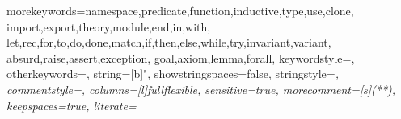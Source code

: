 

\newcommand{\why}{\textsf{Why3}\xspace}
\newcommand{\whyml}{\textsf{WhyML}\xspace}
\newcommand{\eg}{\emph{e.g.}\xspace}
\newcommand{\ie}{\emph{i.e.}\xspace}

\newcommand{\keyword}[1]{\texttt{#1}}
\newcommand{\indextt}[1]{\index{#1@\protect\keyword{#1}}}
\newcommand{\indexttbs}[1]{\index{#1@\protect\keywordbs{#1}}}
\newif\ifspace
\newif\ifnewentry
\newcommand{\addspace}{\ifspace ~ \spacefalse \fi}
\newcommand{\term}[2]{\addspace\hbox{\lstinline|#1|%
\ifthenelse{\equal{#2}{}}{}{\indexttbase{#2}{#1}}}\spacetrue}
\newcommand{\nonterm}[2]{%
  \ifthenelse{\equal{#2}{}}%
             {\addspace\hbox{\textsl{#1}\ifnewentry\index{#1@\textsl{#1}}\fi}\spacetrue}%
             {\addspace\hbox{\textsl{#1}\footnote{#2}\ifnewentry\index{grammar entries!\textsl{#1}}\fi}\spacetrue}}
\newcommand{\repetstar}{$^*$\spacetrue}
\newcommand{\repetplus}{$^+$\spacetrue}
\newcommand{\repetone}{$^?$\spacetrue}
\newcommand{\lparen}{\addspace(}
\newcommand{\rparen}{)}
\newcommand{\orelse}{\addspace$\mid$\spacetrue}
\newcommand{\sep}{ \\[2mm] \spacefalse\newentrytrue}
\newcommand{\newl}{ \\ & & \spacefalse}
\newcommand{\alt}{ \\ & $\mid$ & \spacefalse}
\newcommand{\is}{ & $::=$ & \newentryfalse}
\newenvironment{syntax}{\begin{tabular}{@{}rrll@{}}\spacefalse\newentrytrue}{\end{tabular}}
\newcommand{\synt}[1]{$\spacefalse#1$}
\newcommand{\emptystring}{$\epsilon$}
\newcommand{\below}{See\; below}


\RequirePackage{listings}
\RequirePackage{amssymb}


{
morekeywords={namespace,predicate,function,inductive,type,use,clone,%
import,export,theory,module,end,in,with,%
let,rec,for,to,do,done,match,if,then,else,while,try,invariant,variant,%
absurd,raise,assert,exception,%
goal,axiom,lemma,forall},%
keywordstyle={\color{blue}},%
otherkeywords={},%
string=[b]",%
showstringspaces=false,%
stringstyle=\itshape,%
commentstyle=\itshape,%
columns=[l]fullflexible,%
sensitive=true,%
morecomment=[s]{(*}{*)},%
keepspaces=true,
literate=%
%
%
}


